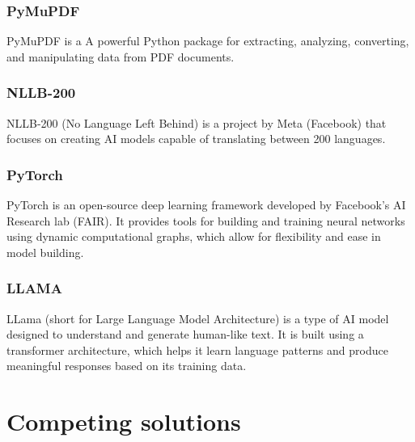\documentclass[12pt,oneside,openright,a4paper]{cpe-english-project}
\begin{document}
\subsubsection{PyMuPDF} PyMuPDF is a A powerful Python package for extracting, analyzing, converting, and manipulating data from PDF documents.

\subsubsection{NLLB-200} NLLB-200 (No Language Left Behind) is a project by Meta (Facebook) that focuses on creating AI models capable of translating between 200 languages.

\subsubsection{PyTorch} PyTorch is an open-source deep learning framework developed by Facebook's AI Research lab (FAIR). It provides tools for building and training neural networks using dynamic computational graphs, which allow for flexibility and ease in model building.

\subsubsection{LLAMA} LLama (short for Large Language Model Architecture) is a type of AI model designed to understand and generate human-like text. It is built using a transformer architecture, which helps it learn language patterns and produce meaningful responses based on its training data.

\section{Competing solutions}
\end{document}
